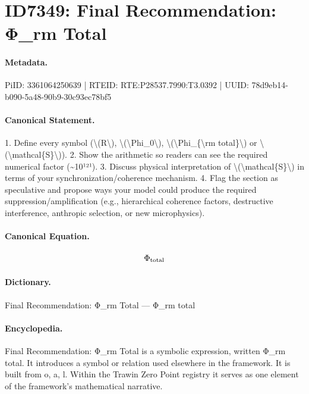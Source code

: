 \section*{ID7349: Final Recommendation: Φ\_rm Total}
\paragraph{Metadata.}
PiID: 3361064250639 | RTEID: RTE:P28537.7990:T3.0392 | UUID: 78d9eb14-b090-5a48-90b9-30c93ec78bf5

\paragraph{Canonical Statement.}
1. Define every symbol (\textbackslash{}(R\textbackslash{}), \textbackslash{}(\textbackslash{}Phi\_0\textbackslash{}), \textbackslash{}(\textbackslash{}Phi\_\{\textbackslash{}rm total\}\textbackslash{}) or \textbackslash{}(\textbackslash{}mathcal\{S\}\textbackslash{})). 2. Show the arithmetic so readers can see the required numerical factor (\textasciitilde{}10¹²¹). 3. Discuss physical interpretation of \textbackslash{}(\textbackslash{}mathcal\{S\}\textbackslash{}) in terms of your synchronization/coherence mechanism. 4. Flag the section as speculative and propose ways your model could produce the required suppression/amplification (e.g., hierarchical coherence factors, destructive interference, anthropic selection, or new microphysics).

\paragraph{Canonical Equation.}
\[
\Phi_{\rm total}
\]

\paragraph{Dictionary.}
Final Recommendation: Φ\_rm Total — Φ\_rm total

\paragraph{Encyclopedia.}
Final Recommendation: Φ\_rm Total is a symbolic expression, written Φ\_rm total. It introduces a symbol or relation used elsewhere in the framework. It is built from o, a, l. Within the Trawin Zero Point registry it serves as one element of the framework's mathematical narrative.
